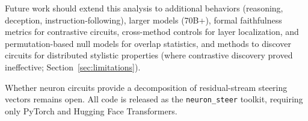 \documentclass[11pt]{article}
\begin{document}
Future work should extend this analysis to additional behaviors (reasoning, deception, instruction-following), larger models (70B+), formal faithfulness metrics for contrastive circuits, cross-method controls for layer localization, and permutation-based null models for overlap statistics, and methods to discover circuits for distributed stylistic properties (where contrastive discovery proved ineffective; Section~\ref{sec:limitations}).

Whether neuron circuits provide a decomposition of residual-stream steering vectors remains open.
All code is released as the \texttt{neuron\_steer} toolkit, requiring only PyTorch and Hugging Face Transformers.


\end{document}
